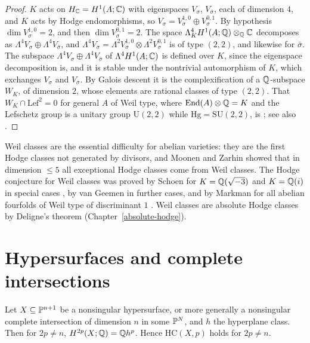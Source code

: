\begin{proof}
$K$ acts on $H_{\mathbb{C}} = H^1(A; \mathbb{C})$ with eigenspaces $V_\sigma$, $V_{\bar\sigma}$, each of dimension $4$, and $K$ acts by Hodge endomorphisms, so $V_\sigma = V_\sigma^{1,0} \oplus V_\sigma^{0,1}$. By
hypothesis $\dim V_\sigma^{1,0} = 2$, and then $\dim V_\sigma^{0,1} = 2$. The space $\Lambda^4_KH^1(A; \mathbb{Q}) \otimes_{\mathbb{Q}}\mathbb{C}$ decomposes as $\Lambda^4V_\sigma \oplus \Lambda^4V_{\bar\sigma}$, and
$\Lambda^4V_\sigma = \Lambda^2V_\sigma^{1,0} \otimes \Lambda^2V_\sigma^{0,1}$ is of type $(2,2)$, and likewise for $\bar\sigma$. The subspace $\Lambda^4V_\sigma \oplus \Lambda^4V_{\bar\sigma}$ of
$\Lambda^4H^1(A; \mathbb{C})$ is defined over $K$, since the eigenspace decomposition is, and it is stable under the nontrivial automorphism of $K$, which exchanges $V_\sigma$ and $V_{\bar\sigma}$. By Galois
descent it is the complexification of a $\mathbb{Q}$-subspace $W_K$, of dimension $2$, whose elements are rational classes of type $(2,2)$. That $W_K \cap \mathrm{Lef}^2 = 0$ for general $A$ of Weil type, where $\operatorname{End}(A) \otimes \mathbb{Q} = K$ and the Lefschetz
group is a unitary group $\mathrm{U}(2,2)$ while $\mathrm{Hg} = \mathrm{SU}(2,2)$, is \cite{weil-1977}; see also \cite{birkenhake-lange}.
\end{proof}

\begin{remark}\label{known-cases:remark-weil-classes}
Weil classes are the essential difficulty for abelian varieties: they are the first Hodge classes not generated by divisors, and Moonen and Zarhin showed that in dimension $\leq 5$
all exceptional Hodge classes come from Weil classes. The Hodge conjecture for Weil classes was proved by Schoen for $K = \mathbb{Q}(\sqrt{-3})$ and $K = \mathbb{Q}(i)$ in special cases \cite{schoen-1988},
by van Geemen in further cases, and by Markman for all abelian fourfolds of Weil type of discriminant $1$ \cite{markman-2023}. Weil classes are absolute Hodge classes by Deligne's theorem
(Chapter~\ref{absolute-hodge}).
\end{remark}

\section{Hypersurfaces and complete intersections}\label{known-cases:section-hypersurfaces}

\begin{proposition}\label{known-cases:proposition-hypersurfaces}
Let $X \subseteq \mathbb{P}^{n+1}$ be a nonsingular hypersurface, or more generally a nonsingular complete intersection of dimension $n$ in some $\mathbb{P}^N$, and $h$ the hyperplane class. Then for $2p \neq n$,
$H^{2p}(X; \mathbb{Q}) = \mathbb{Q} h^p$. Hence $\mathrm{HC}(X, p)$ holds for $2p \neq n$.
\end{proposition}

